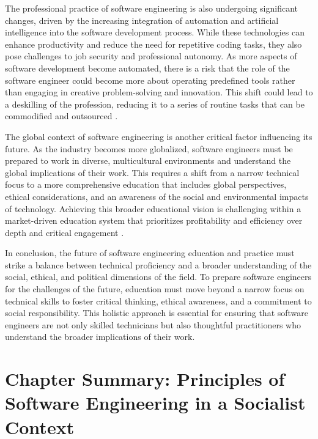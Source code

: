 \begin{refsection}
The professional practice of software engineering is also undergoing significant changes, driven by the increasing integration of automation and artificial intelligence into the software development process. While these technologies can enhance productivity and reduce the need for repetitive coding tasks, they also pose challenges to job security and professional autonomy. As more aspects of software development become automated, there is a risk that the role of the software engineer could become more about operating predefined tools rather than engaging in creative problem-solving and innovation. This shift could lead to a deskilling of the profession, reducing it to a series of routine tasks that can be commodified and outsourced \cite[pp.~67-70]{braverman2020labor}.

The global context of software engineering is another critical factor influencing its future. As the industry becomes more globalized, software engineers must be prepared to work in diverse, multicultural environments and understand the global implications of their work. This requires a shift from a narrow technical focus to a more comprehensive education that includes global perspectives, ethical considerations, and an awareness of the social and environmental impacts of technology. Achieving this broader educational vision is challenging within a market-driven education system that prioritizes profitability and efficiency over depth and critical engagement \cite[pp.~78-81]{smith2020uneven}.

In conclusion, the future of software engineering education and practice must strike a balance between technical proficiency and a broader understanding of the social, ethical, and political dimensions of the field. To prepare software engineers for the challenges of the future, education must move beyond a narrow focus on technical skills to foster critical thinking, ethical awareness, and a commitment to social responsibility. This holistic approach is essential for ensuring that software engineers are not only skilled technicians but also thoughtful practitioners who understand the broader implications of their work.

\section{Chapter Summary: Principles of Software Engineering in a Socialist Context}


\end{refsection}
